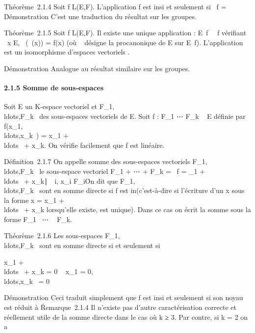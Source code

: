 \documentclass[]{article}
\begin{document}
Théorème~2.1.4 Soit f \in L(E,F). L'application f est in\jmathective si et
seulement si \mathrmKer~f =
\0\.

Démonstration C'est une traduction du résultat sur les groupes.

Théorème~2.1.5 Soit f \in L(E,F). Il existe une unique application
\overlinef :
E\diagup\mathrmKer~f
\rightarrow~\mathrmIm~f vérifiant
\forall~x \in E, \overlinef~(\pi~(x)) =
f(x) (où \pi~ désigne la pro\jmathection canonique de E sur
E\diagup\mathrmKer~f).
L'application \overlinef est un isomorphisme
d'espaces vectoriels .

Démonstration Analogue au résultat similaire sur les groupes.

\paragraph{2.1.5 Somme de sous-espaces}

Soit E un K-espace vectoriel et
F\_1,\\ldots,F\_k~
des sous-espaces vectoriels de E. Soit f : F\_1
\times⋯ \times F\_k \rightarrow~ E définie par
f(x\_1,\\ldots,x\_k~)
= x\_1 +
\\ldots~ +
x\_k. On vérifie facilement que f est linéaire.

Définition~2.1.7 On appelle somme des sous-espaces vectoriels
F\_1,\\ldots,F\_k~
le sous-espace vectoriel F\_1 + ⋯ +
F\_k = \mathrmIm~f =
\x\_1 +
\\ldots~ +
x\_k∣\forall~~i,
x\_i \in F\_i\. On dit que
F\_1,\\ldots,F\_k~
sont en somme directe si f est in\jmathective (c'est-à-dire si l'écriture
d'un x sous la forme x = x\_1 +
\\ldots~ +
x\_k lorsqu'elle existe, est unique). Dans ce cas on écrit la
somme sous la forme F\_1 \oplus~⋯ \oplus~
F\_k.

Théorème~2.1.6 Les sous-espaces
F\_1,\\ldots,F\_k~
sont en somme directe si et seulement si

x\_1 +
\\ldots~ +
x\_k = 0 \rigtharrow~ x\_1 =
0,\\ldots,x\_k~
= 0

Démonstration Ceci traduit simplement que f est in\jmathective si et
seulement si son noyau est réduit à
\0\.

Remarque~2.1.4 Il n'existe pas d'autre caractérisation correcte et
réellement utile de la somme directe dans le cas où k ≥ 3. Par contre,
si k = 2 on a
\end{document}
